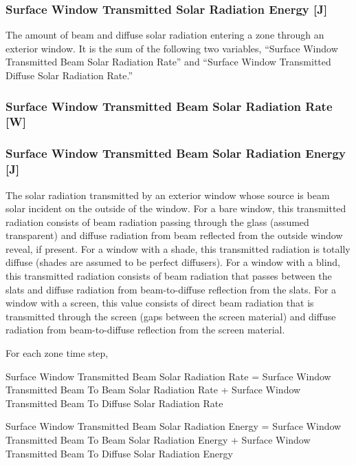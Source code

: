 \subsubsection{Surface Window Transmitted Solar Radiation Energy {[}J{]}}\label{surface-window-transmitted-solar-radiation-energy-j}

The amount of beam and diffuse solar radiation entering a zone through an exterior window. It is the sum of the following two variables, ``Surface Window Transmitted Beam Solar Radiation Rate'' and ``Surface Window Transmitted Diffuse Solar Radiation Rate.''

\subsubsection{Surface Window Transmitted Beam Solar Radiation Rate {[}W{]}}\label{surface-window-transmitted-beam-solar-radiation-rate-w}

\subsubsection{Surface Window Transmitted Beam Solar Radiation Energy {[}J{]}}\label{surface-window-transmitted-beam-solar-radiation-energy-j}

The solar radiation transmitted by an exterior window whose source is beam solar incident on the outside of the window. For a bare window, this transmitted radiation consists of beam radiation passing through the glass (assumed transparent) and diffuse radiation from beam reflected from the outside window reveal, if present. For a window with a shade, this transmitted radiation is totally diffuse (shades are assumed to be perfect diffusers). For a window with a blind, this transmitted radiation consists of beam radiation that passes between the slats and diffuse radiation from beam-to-diffuse reflection from the slats. For a window with a screen, this value consists of direct beam radiation that is transmitted through the screen (gaps between the screen material) and diffuse radiation from beam-to-diffuse reflection from the screen material.

For each zone time step,

Surface Window Transmitted Beam Solar Radiation Rate = Surface Window Transmitted Beam To Beam Solar Radiation Rate + Surface Window Transmitted Beam To Diffuse Solar Radiation Rate

Surface Window Transmitted Beam Solar Radiation Energy = Surface Window Transmitted Beam To Beam Solar Radiation Energy + Surface Window Transmitted Beam To Diffuse Solar Radiation Energy

